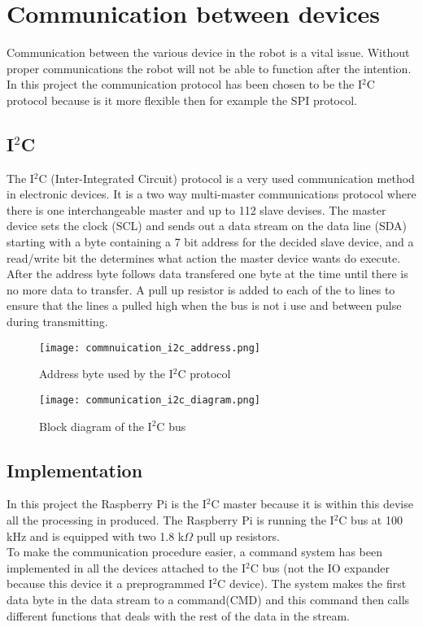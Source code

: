 \chapter{Communication between devices}
\label{ch_communication}
Communication between the various device in the robot is a vital issue. Without proper communications the robot will not be able to function after the intention. In this project the communication protocol has been chosen to be the I$^2$C protocol because is it more flexible then for example the SPI protocol.    
\section{I$^2$C}
The I$^2$C (Inter-Integrated Circuit) protocol is a very used communication method in electronic devices. It is a two way multi-master communications protocol where there is one interchangeable master and up to 112 slave devises. The master device sets the clock (SCL) and sends out a data stream on the data line (SDA) starting with a byte containing a 7 bit address for the decided slave device, and a read/write bit the determines what action the master device wants do execute. After the address byte follows data transfered one byte at the time until there is no more data to transfer. A pull up resistor is added to each of the to lines to ensure that the lines a pulled high when the bus is not i use and between pulse during transmitting.

\begin{figure}[!h]
	\centering
	\texttt{[image: commnuication\_i2c\_address.png]}
	\caption{Address byte used by the I$^2$C protocol}
	\label{fig:communication_I2C_address}
\end{figure}


\begin{figure}[!h]
	\centering
	\texttt{[image: communication\_i2c\_diagram.png]}
	\caption{Block diagram of the I$^2$C bus}
	\label{fig:communication_I2C_diagram}
\end{figure}


\section{Implementation}
In this project the Raspberry Pi is the I$^2$C master because it is within this devise all the processing in produced. The Raspberry Pi is running the I$^2$C bus at 100 kHz and is equipped with two 1.8 k$\Omega$ pull up resistors.\\ To make the communication procedure easier, a command system has been implemented in all the devices attached to the I$^2$C bus (not the IO expander because this device it a preprogrammed I$^2$C device). The system makes the first data byte in the data stream to a command(CMD) and this command then calls different functions that deals with the rest of the data in the stream.   



